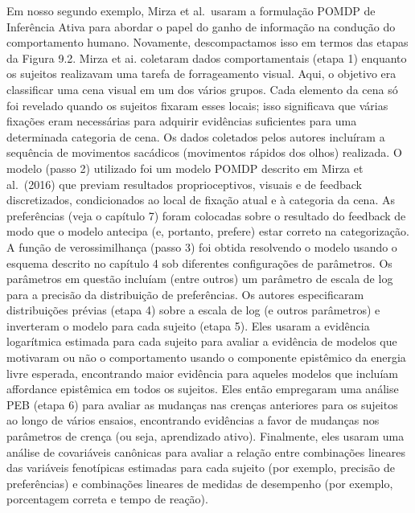 \documentclass[
  12pt,
]{book}
\begin{document}
Em nosso segundo exemplo, Mirza et al.~usaram a formulação POMDP de Inferência Ativa para abordar o papel do ganho de informação na condução do comportamento humano. Novamente, descompactamos isso em termos das etapas da Figura 9.2. Mirza et ai. coletaram dados comportamentais (etapa 1) enquanto os sujeitos realizavam uma tarefa de forrageamento visual. Aqui, o objetivo era classificar uma cena visual em um dos vários grupos. Cada elemento da cena só foi revelado quando os sujeitos fixaram esses locais; isso significava que várias fixações eram necessárias para adquirir evidências suficientes para uma determinada categoria de cena. Os dados coletados pelos autores incluíram a sequência de movimentos sacádicos (movimentos rápidos dos olhos) realizada. O modelo (passo 2) utilizado foi um modelo POMDP descrito em Mirza et al.~(2016) que previam resultados proprioceptivos, visuais e de feedback discretizados, condicionados ao local de fixação atual e à categoria da cena. As preferências (veja o capítulo 7) foram colocadas sobre o resultado do feedback de modo que o modelo antecipa (e, portanto, prefere) estar correto na categorização. A função de verossimilhança (passo 3) foi obtida resolvendo o modelo usando o esquema descrito no capítulo 4 sob diferentes configurações de parâmetros. Os parâmetros em questão incluíam (entre outros) um parâmetro de escala de log para a precisão da distribuição de preferências. Os autores especificaram distribuições prévias (etapa 4) sobre a escala de log (e outros parâmetros) e inverteram o modelo para cada sujeito (etapa 5). Eles usaram a evidência logarítmica estimada para cada sujeito para avaliar a evidência de modelos que motivaram ou não o comportamento usando o componente epistêmico da energia livre esperada, encontrando maior evidência para aqueles modelos que incluíam affordance epistêmica em todos os sujeitos. Eles então empregaram uma análise PEB (etapa 6) para avaliar as mudanças nas crenças anteriores para os sujeitos ao longo de vários ensaios, encontrando evidências a favor de mudanças nos parâmetros de crença (ou seja, aprendizado ativo). Finalmente, eles usaram uma análise de covariáveis \hspace{0pt}\hspace{0pt}canônicas para avaliar a relação entre combinações lineares das variáveis \hspace{0pt}\hspace{0pt}fenotípicas estimadas para cada sujeito (por exemplo, precisão de preferências) e combinações lineares de medidas de desempenho (por exemplo, porcentagem correta e tempo de reação).
\end{document}

